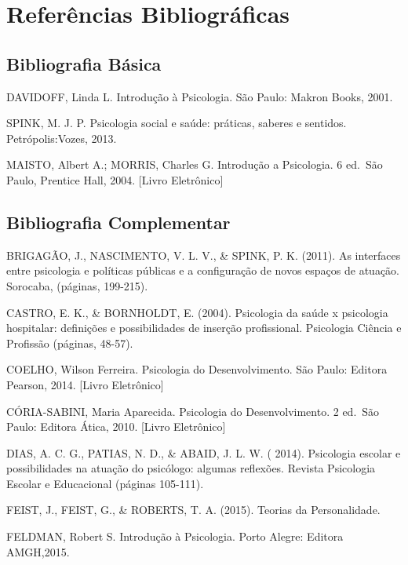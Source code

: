 \documentclass[
]{book}
\begin{document}
\hypertarget{referuxeancias-bibliogruxe1ficas}{%
\section{Referências Bibliográficas}\label{referuxeancias-bibliogruxe1ficas}}

\hypertarget{bibliografia-buxe1sica}{%
\subsection{Bibliografia Básica}\label{bibliografia-buxe1sica}}

DAVIDOFF, Linda L. Introdução à Psicologia. São Paulo: Makron Books, 2001.

SPINK, M. J. P. Psicologia social e saúde: práticas, saberes e sentidos. Petrópolis:Vozes, 2013.

MAISTO, Albert A.; MORRIS, Charles G. Introdução a Psicologia. 6 ed.~São Paulo, Prentice Hall, 2004. {[}Livro Eletrônico{]}

\hypertarget{bibliografia-complementar}{%
\subsection{Bibliografia Complementar}\label{bibliografia-complementar}}

BRIGAGÃO, J., NASCIMENTO, V. L. V., \& SPINK, P. K. (2011). As interfaces entre psicologia e políticas públicas e a configuração de novos espaços de atuação. Sorocaba, (páginas, 199-215).

CASTRO, E. K., \& BORNHOLDT, E. (2004). Psicologia da saúde x psicologia hospitalar: definições e possibilidades de inserção profissional. Psicologia Ciência e Profissão (páginas, 48-57).

COELHO, Wilson Ferreira. Psicologia do Desenvolvimento. São Paulo: Editora Pearson, 2014. {[}Livro Eletrônico{]}

CÓRIA-SABINI, Maria Aparecida. Psicologia do Desenvolvimento. 2 ed.~São Paulo: Editora Ática, 2010. {[}Livro Eletrônico{]}

DIAS, A. C. G., PATIAS, N. D., \& ABAID, J. L. W. ( 2014). Psicologia escolar e possibilidades na atuação do psicólogo: algumas reflexões. Revista Psicologia Escolar e Educacional (páginas 105-111).

FEIST, J., FEIST, G., \& ROBERTS, T. A. (2015). Teorias da Personalidade.

FELDMAN, Robert S. Introdução à Psicologia. Porto Alegre: Editora AMGH,2015.
\end{document}
